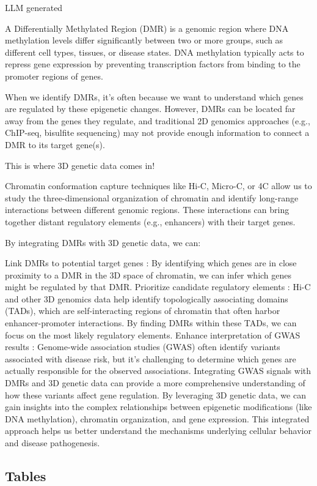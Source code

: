 \documentclass{article}
\begin{document}
{\color{iris} LLM generated

A Differentially Methylated Region (DMR) is a genomic region where DNA methylation levels differ significantly between two or more groups, such as different cell types, tissues, or disease states. DNA methylation typically acts to repress gene expression by preventing transcription factors from binding to the promoter regions of genes.

When we identify DMRs, it's often because we want to understand which genes are regulated by these epigenetic changes. However, DMRs can be located far away from the genes they regulate, and traditional 2D genomics approaches (e.g., ChIP-seq, bisulfite sequencing) may not provide enough information to connect a DMR to its target gene(s).

This is where 3D genetic data comes in!

Chromatin conformation capture techniques like Hi-C, Micro-C, or 4C allow us to study the three-dimensional organization of chromatin and identify long-range interactions between different genomic regions. These interactions can bring together distant regulatory elements (e.g., enhancers) with their target genes.

By integrating DMRs with 3D genetic data, we can:

Link DMRs to potential target genes : By identifying which genes are in close proximity to a DMR in the 3D space of chromatin, we can infer which genes might be regulated by that DMR.
Prioritize candidate regulatory elements : Hi-C and other 3D genomics data help identify topologically associating domains (TADs), which are self-interacting regions of chromatin that often harbor enhancer-promoter interactions. By finding DMRs within these TADs, we can focus on the most likely regulatory elements.
Enhance interpretation of GWAS results : Genome-wide association studies (GWAS) often identify variants associated with disease risk, but it's challenging to determine which genes are actually responsible for the observed associations. Integrating GWAS signals with DMRs and 3D genetic data can provide a more comprehensive understanding of how these variants affect gene regulation.
By leveraging 3D genetic data, we can gain insights into the complex relationships between epigenetic modifications (like DNA methylation), chromatin organization, and gene expression. This integrated approach helps us better understand the mechanisms underlying cellular behavior and disease pathogenesis.
}
\subsection{Tables}
\end{document}

